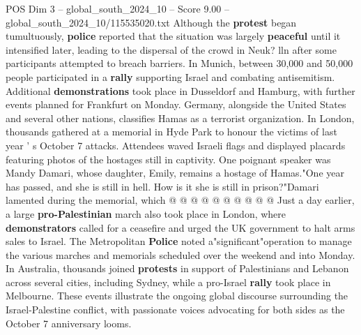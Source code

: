 \begin{textsample}{POS Dim 3 – global\_south\_2024\_10 – Score 9.00 – global\_south\_2024\_10/115535020.txt}
Although the \textbf{protest} began tumultuously, \textbf{police} reported that the situation was largely \textbf{peaceful} until it intensified later, leading to the dispersal of the crowd in Neuk? lln after some participants attempted to breach barriers.
In Munich, between 30,000 and 50,000 people participated in a \textbf{rally} supporting Israel and combating antisemitism.
Additional \textbf{demonstrations} took place in Dusseldorf and Hamburg, with further events planned for Frankfurt on Monday.
Germany, alongside the United States and several other nations, classifies Hamas as a terrorist organization.
In London, thousands gathered at a memorial in Hyde Park to honour the victims of last year ' s October 7 attacks.
Attendees waved Israeli flags and displayed placards featuring photos of the hostages still in captivity.
One poignant speaker was Mandy Damari, whose daughter, Emily, remains a hostage of Hamas."One year has passed, and she is still in hell.
How is it she is still in prison?"Damari lamented during the memorial, which @ @ @ @ @ @ @ @ @ @ Just a day earlier, a large \textbf{pro-Palestinian} march also took place in London, where \textbf{demonstrators} called for a ceasefire and urged the UK government to halt arms sales to Israel.
The Metropolitan \textbf{Police} noted a"significant"operation to manage the various marches and memorials scheduled over the weekend and into Monday.
In Australia, thousands joined \textbf{protests} in support of Palestinians and Lebanon across several cities, including Sydney, while a pro-Israel \textbf{rally} took place in Melbourne.
These events illustrate the ongoing global discourse surrounding the Israel-Palestine conflict, with passionate voices advocating for both sides as the October 7 anniversary looms.

\end{textsample}
